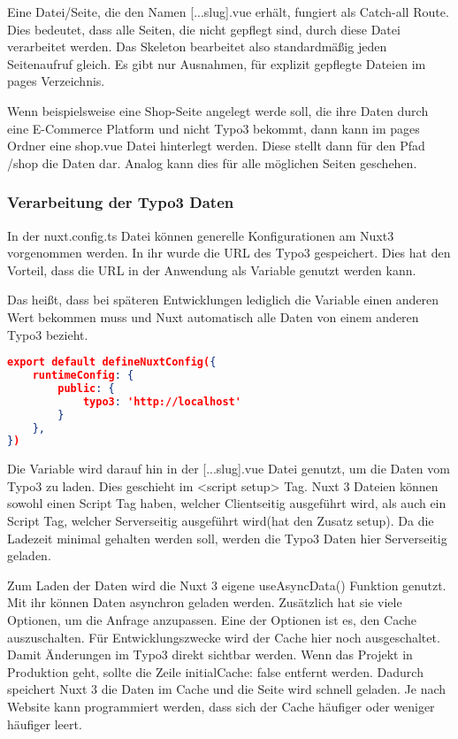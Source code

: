 Eine Datei/Seite, die den Namen [...slug].vue erhält, fungiert als Catch-all Route. Dies bedeutet, dass alle Seiten, die nicht gepflegt sind, durch diese Datei verarbeitet werden. Das Skeleton bearbeitet also standardmäßig jeden Seitenaufruf gleich. Es gibt nur Ausnahmen, für explizit gepflegte Dateien im pages Verzeichnis.

Wenn beispielsweise eine Shop-Seite angelegt werde soll, die ihre Daten durch eine E-Commerce Platform und nicht Typo3 bekommt, dann kann im pages Ordner eine shop.vue Datei hinterlegt werden. Diese stellt dann für den Pfad /shop die Daten dar. Analog kann dies für alle möglichen Seiten geschehen. 

\subsubsection{Verarbeitung der Typo3 Daten}
\label{sec:Verarbeitung der Typo3 Daten}

In der nuxt.config.ts Datei können generelle Konfigurationen am Nuxt3 vorgenommen werden. In ihr wurde die URL des Typo3 gespeichert. Dies hat den Vorteil, dass die URL in der Anwendung als Variable genutzt werden kann. 

Das heißt, dass bei späteren Entwicklungen lediglich die Variable einen anderen Wert bekommen muss und Nuxt automatisch alle Daten von einem anderen Typo3 bezieht.

\begin{lstlisting}[language=json,firstnumber=1]
export default defineNuxtConfig({
    runtimeConfig: {
        public: {
            typo3: 'http://localhost'
        }
    },
})
\end{lstlisting}

Die Variable wird darauf hin in der [...slug].vue Datei genutzt, um die Daten vom Typo3 zu laden. Dies geschieht im <script setup> Tag. Nuxt 3 Dateien können sowohl einen Script Tag haben, welcher Clientseitig ausgeführt wird, als auch ein Script Tag, welcher Serverseitig ausgeführt wird(hat den Zusatz setup). Da die Ladezeit minimal gehalten werden soll, werden die Typo3 Daten hier Serverseitig geladen. 

Zum Laden der Daten wird die Nuxt 3 eigene useAsyncData() Funktion genutzt. Mit ihr können Daten asynchron geladen werden. Zusätzlich hat sie viele Optionen, um die Anfrage anzupassen. Eine der Optionen ist es, den Cache auszuschalten. Für Entwicklungszwecke wird der Cache hier noch ausgeschaltet. Damit Änderungen im Typo3 direkt sichtbar werden. Wenn das Projekt in Produktion geht, sollte die Zeile {initialCache: false} entfernt werden. Dadurch speichert Nuxt 3 die Daten im Cache und die Seite wird schnell geladen. Je nach Website kann programmiert werden, dass sich der Cache häufiger oder weniger häufiger leert.

